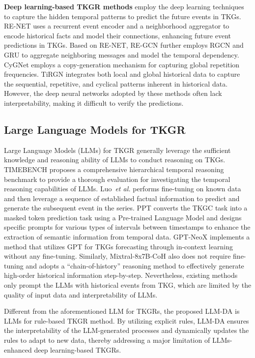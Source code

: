 \documentclass{article}
\begin{document}
\textbf{Deep learning-based TKGR methods} \citep{DBLP:conf/kdd/DengRN20, wang2023qdn, liu2024arc,wang2023multi} employ the deep learning techniques to capture the hidden temporal patterns to predict the future events in TKGs. RE-NET \citep{jin2019recurrent} uses a recurrent event encoder and a neighborhood aggregator to encode historical facts and model their connections, enhancing future event predictions in TKGs. Based on RE-NET, RE-GCN \citep{li2021temporal} further employs RGCN and GRU to aggregate neighboring messages and model the temporal dependency. CyGNet \citep{DBLP:conf/aaai/ZhuCFCZ21} employs a copy-generation mechanism for capturing global repetition frequencies. 
TiRGN \citep{li2022tirgn} integrates both local and global historical data to capture the sequential, repetitive, and cyclical patterns inherent in historical data. 
However, the deep neural networks adopted by these methods often lack interpretability, making it difficult to verify the predictions.

\subsection{Large Language Models for TKGR}
Large Language Models (LLMs) for TKGR generally leverage the sufficient knowledge and reasoning ability of LLMs to conduct reasoning on TKGs. TIMEBENCH \citep{chu2023timebench} proposes a comprehensive hierarchical temporal reasoning benchmark to provide a thorough evaluation for investigating the temporal reasoning capabilities of LLMs. Luo~\emph{et al.}
\cite{luo2024chain} performs fine-tuning on known data and then leverage a sequence of established factual information to predict and generate the subsequent event in the series. PPT \citep{xu2023pre} converts the TKGC task into a masked token prediction task using a Pre-trained Language Model and designs specific prompts for various types of intervals between timestamps to enhance the extraction of semantic information from temporal data. GPT-NeoX \citep{lee2023temporal} implements a method that utilizes GPT for TKGs forecasting through in-context learning without any fine-tuning. Similarly, Mixtral-8x7B-CoH \citep{xia2024enhancing} also does not require fine-tuning and adopts a ``chain-of-history'' reasoning method to effectively generate high-order historical information step-by-step. Nevertheless, existing methods only prompt the LLMs with historical events from TKG, which are limited by the quality of input data and interpretability of LLMs.


Different from the aforementioned LLM for TKGRs, the proposed LLM-DA is LLMs for rule-based TKGR method. By utilizing explicit rules, LLM-DA ensures the interpretability of the LLM-generated processes and dynamically updates the rules to adapt to new data, thereby addressing a major limitation of LLMs-enhanced deep learning-based TKGRs.
\end{document}
